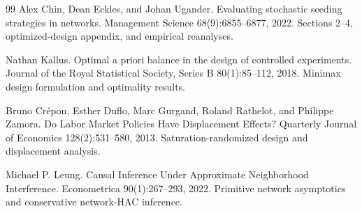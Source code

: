 \documentclass{article}
\begin{document}
\begin{thebibliography}{99}
   Alex Chin, Dean Eckles, and Johan Ugander. Evaluating stochastic seeding strategies in networks. Management Science 68(9):6855--6877, 2022. Sections 2--4, optimized-design appendix, and empirical reanalyses.

   Nathan Kallus. Optimal a priori balance in the design of controlled experiments. Journal of the Royal Statistical Society, Series B 80(1):85--112, 2018. Minimax design formulation and optimality results.

   Bruno Crépon, Esther Duflo, Marc Gurgand, Roland Rathelot, and Philippe Zamora. Do Labor Market Policies Have Displacement Effects? Quarterly Journal of Economics 128(2):531--580, 2013. Saturation-randomized design and displacement analysis.

   Michael P. Leung. Causal Inference Under Approximate Neighborhood Interference. Econometrica 90(1):267--293, 2022. Primitive network asymptotics and conservative network-HAC inference.

\end{thebibliography}
\end{document}
